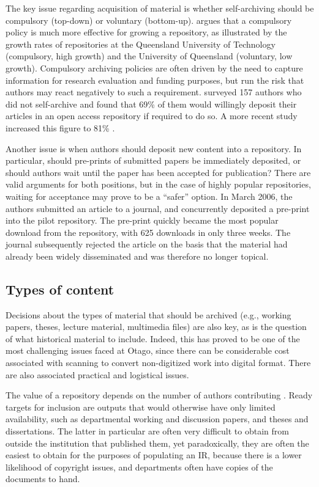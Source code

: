 \documentclass[12pt,pdftex,a4paper,titlepage]{article}
\begin{document}
The key issue regarding acquisition of material is whether self-archiving should be compulsory (top-down) or voluntary (bottom-up).  \citeyear{Sale-A-2005-NZIRW,Sale-A-2006-OAchapter} argues that a compulsory policy is much more effective for growing a repository, as illustrated by the growth rates of repositories at the Queensland University of Technology (compulsory, high growth) and the University of Queensland (voluntary, low growth). Compulsory archiving policies are often driven by the need to capture information for research evaluation and funding purposes, but run the risk that authors may react negatively to such a requirement.  surveyed 157 authors who did not self-archive and found that 69\% of them would willingly deposit their articles in an open access repository if required to do so. A more recent study increased this figure to 81\% \cite{Swan-A-2006-OAchapter}.

Another issue is when authors should deposit new content into a repository. In particular, should pre-prints of submitted papers be immediately deposited, or should authors wait until the paper has been accepted for publication? There are valid arguments for both positions, but in the case of highly popular repositories, waiting for acceptance may prove to be a ``safer'' option. In March 2006, the authors submitted an article to a journal, and concurrently deposited a pre-print \cite{Stan-N-2006-running} into the pilot repository. The pre-print quickly became the most popular download from the repository, with 625 downloads in only three weeks. The journal subsequently rejected the article on the basis that the material had already been widely disseminated and was therefore no longer topical.


\subsection{Types of content}

Decisions about the types of material that should be archived (e.g., working papers, theses, lecture material, multimedia files) are also key, as is the question of what historical material to include. Indeed, this has proved to be one of the most challenging issues faced at Otago, since there can be considerable cost associated with scanning to convert non-digitized work into digital format. There are also associated practical and logistical issues.

The value of a repository depends on the number of authors contributing \cite{Rank-J-2005-feasibility}. Ready targets for inclusion are outputs that would otherwise have only limited availability, such as departmental working and discussion papers, and theses and dissertations. The latter in particular are often very difficult to obtain from outside the institution that published them, yet paradoxically, they are often the easiest to obtain for the purposes of populating an IR, because there is a lower likelihood of copyright issues, and departments often have copies of the documents to hand.
\end{document}
